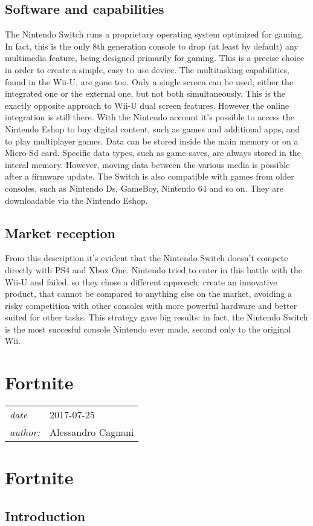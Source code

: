 \documentclass[a4paper,10pt]{book}
\newcommand{\pageHeader}[4]{
    \section{#1}
    \vspace{-0.3cm}
    \begin{table}[h!]
     \begin{tabular}{ll}
        \hline
        \textit{date} & #2 \\
        \textit{author: } & #3\\
        \hline
     \end{tabular}
    \end{table}
    \vspace{-0.3cm}
}
\begin{document}
 \subsection{ Software and capabilities  }
  The Nintendo Switch runs a proprietary operating system optimized for gaming. In fact, this is the only 8th generation console to drop (at least by default) any multimedia feature, being designed primarily for gaming. This is a precise choice in order to create a simple, easy to use device.  
  The multitasking capabilities, found in the Wii-U, are gone too. Only a single screen can be used, either the integrated one or the external one, but not both simultaneously. This is the exactly opposite approach to Wii-U dual screen features.  
  However the online integration is still there. With the Nintendo account it's possible to access the Nintendo Eshop to buy digital content, such as games and additional apps, and to play multiplayer games.  
  Data can be stored inside the main memory or on a Micro-Sd card. Specific data types, such as game saves, are always stored in the interal memory. However, moving data between the various media is possible after a firmware update.  
  The Switch is also compatible with games from older consoles, such as Nintendo Ds, GameBoy, Nintendo 64 and so on. They are downloadable via the Nintendo Eshop.  
 \subsection{ Market reception  }
  From this description it's evident that the Nintendo Switch doesn't compete directly with PS4 and Xbox One. Nintendo tried to enter in this battle with the Wii-U and failed, so they chose a different approach: create an innovative product, that cannot be compared to anything else on the market, avoiding a risky competition with other consoles with more powerful hardware and better suited for other tasks.  
  This strategy gave big results: in fact, the Nintendo Switch is the most succesful console Nintendo ever made, second only to the original Wii.  
 \newpage\pageHeader{Fortnite}{2017-07-25}{Alessandro Cagnani}{One of the most influent games of the 8th gen}
 \section{Fortnite }
 \subsection{Introduction }
 
\end{document}
